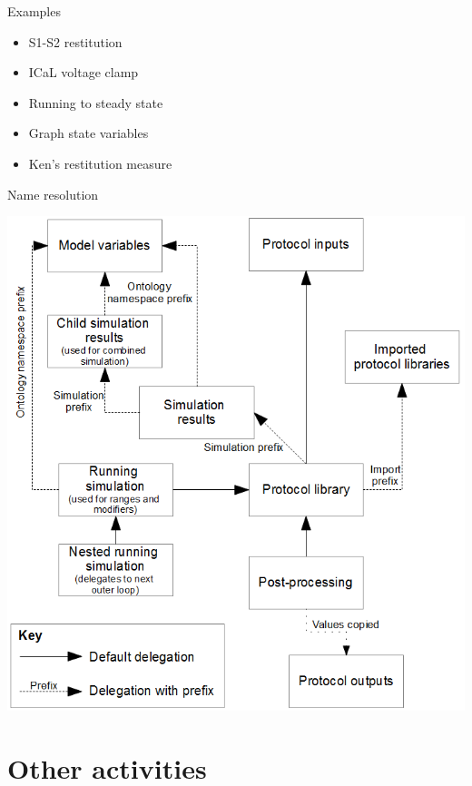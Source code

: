\documentclass[t,xcolor={usenames,dvipsnames}]{beamer}
\begin{document}
\begin{frame}{Examples}
\begin{itemize}
\item S1-S2 restitution
\item ICaL voltage clamp
\item Running to steady state
\item Graph state variables
\item Ken's restitution measure
\end{itemize}
\end{frame}


\begin{frame}{Name resolution}
\begin{center}
\vspace{-.5cm}
\includegraphics{Name_resolution}
\end{center}
\end{frame}

\section{Other activities}
\end{document}
